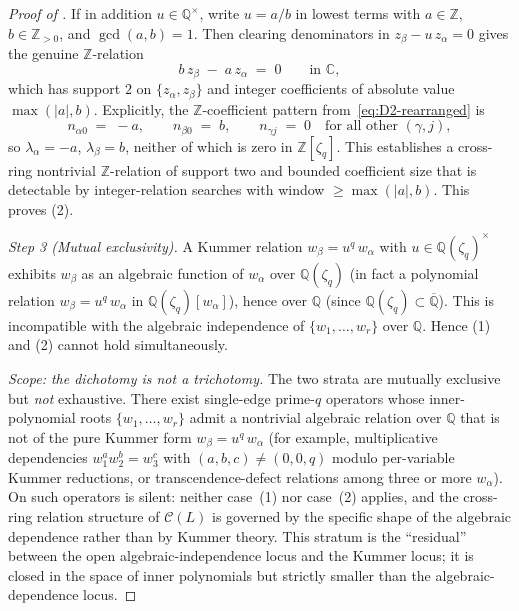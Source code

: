 \documentclass[11pt,a4paper]{article}
\theoremstyle{plain}
\theoremstyle{definition}
\theoremstyle{remark}
\newcommand{\Cl}{\mathcal{C}}
\newcommand{\Zlc}{\mathbb{Z}[\zeta_q]}
\newcommand{\Qlc}{\mathbb{Q}(\zeta_q)}
\begin{document}
\begin{proof}[Proof of ]
If in addition $u \in \mathbb{Q}^\times$, write $u = a / b$ in lowest
terms with $a \in \mathbb{Z}$, $b \in \mathbb{Z}_{> 0}$, and
$\gcd(a, b) = 1$. Then clearing denominators in $z_\beta - u\, z_\alpha
= 0$ gives the genuine $\mathbb{Z}$-relation
\begin{equation}\label{eq:D2-Z-relation}
   b\, z_\beta \;-\; a\, z_\alpha \;=\; 0
   \qquad \text{in } \mathbb{C},
\end{equation}
which has support $2$ on $\{z_\alpha, z_\beta\}$ and integer
coefficients of absolute value $\max(|a|, b)$. Explicitly, the
$\mathbb{Z}$-coefficient pattern from~\eqref{eq:D2-rearranged} is
\[
   n_{\alpha 0} \;=\; -a, \qquad
   n_{\beta 0}  \;=\; b, \qquad
   n_{\gamma j} \;=\; 0 \quad
   \text{for all other } (\gamma, j),
\]
so $\lambda_\alpha = -a$, $\lambda_\beta = b$, neither of which is
zero in $\Zlc$. This establishes a cross-ring nontrivial
$\mathbb{Z}$-relation of support two and bounded coefficient size
that is detectable by integer-relation searches with window
$\ge \max(|a|, b)$. This proves (2).

\smallskip
\textit{Step 3 (Mutual exclusivity).}
A Kummer relation $w_\beta = u^q\, w_\alpha$ with $u \in \Qlc^\times$
exhibits $w_\beta$ as an algebraic function of $w_\alpha$ over $\Qlc$
(in fact a polynomial relation $w_\beta = u^q\, w_\alpha$ in
$\Qlc[w_\alpha]$), hence over $\mathbb{Q}$ (since $\Qlc \subset
\overline{\mathbb{Q}}$). This is incompatible with the algebraic
independence of $\{w_1, \dots, w_r\}$ over $\mathbb{Q}$. Hence (1)
and (2) cannot hold simultaneously.

\smallskip
\textit{Scope: the dichotomy is not a trichotomy.}
The two strata are mutually exclusive but \emph{not} exhaustive. There
exist single-edge prime-$q$ operators whose inner-polynomial roots
$\{w_1, \dots, w_r\}$ admit a nontrivial algebraic relation over
$\mathbb{Q}$ that is not of the pure Kummer form $w_\beta = u^q\,
w_\alpha$ (for example, multiplicative dependencies $w_1^a w_2^b =
w_3^c$ with $(a, b, c) \ne (0, 0, q)$ modulo per-variable Kummer
reductions, or transcendence-defect relations among three or more
$w_\alpha$). On such operators  is silent: neither
case~(1) nor case~(2) applies, and the cross-ring relation structure
of $\Cl(L)$ is governed by the specific shape of the algebraic
dependence rather than by Kummer theory. This stratum is the
``residual'' between the open algebraic-independence locus and the
Kummer locus; it is closed in the space of inner polynomials but
strictly smaller than the algebraic-dependence locus.
\end{proof}
\end{document}
